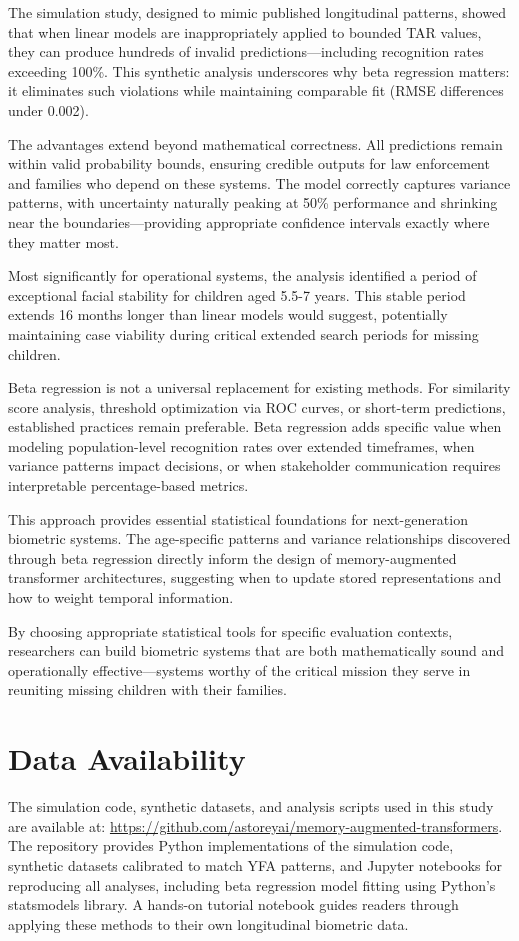 \documentclass[10pt,journal,compsoc]{IEEEtran}
\begin{document}
The simulation study, designed to mimic published longitudinal patterns, showed that when linear models are inappropriately applied to bounded TAR values, they can produce hundreds of invalid predictions---including recognition rates exceeding 100\%. This synthetic analysis underscores why beta regression matters: it eliminates such violations while maintaining comparable fit (RMSE differences under 0.002).

The advantages extend beyond mathematical correctness. All predictions remain within valid probability bounds, ensuring credible outputs for law enforcement and families who depend on these systems. The model correctly captures variance patterns, with uncertainty naturally peaking at 50\% performance and shrinking near the boundaries---providing appropriate confidence intervals exactly where they matter most.

Most significantly for operational systems, the analysis identified a period of exceptional facial stability for children aged 5.5-7 years. This stable period extends 16 months longer than linear models would suggest, potentially maintaining case viability during critical extended search periods for missing children.

Beta regression is not a universal replacement for existing methods. For similarity score analysis, threshold optimization via ROC curves, or short-term predictions, established practices remain preferable. Beta regression adds specific value when modeling population-level recognition rates over extended timeframes, when variance patterns impact decisions, or when stakeholder communication requires interpretable percentage-based metrics.

This approach provides essential statistical foundations for next-generation biometric systems. The age-specific patterns and variance relationships discovered through beta regression directly inform the design of memory-augmented transformer architectures, suggesting when to update stored representations and how to weight temporal information.

By choosing appropriate statistical tools for specific evaluation contexts, researchers can build biometric systems that are both mathematically sound and operationally effective---systems worthy of the critical mission they serve in reuniting missing children with their families.

\section*{Data Availability}
The simulation code, synthetic datasets, and analysis scripts used in this study are available at: \url{https://github.com/astoreyai/memory-augmented-transformers}. The repository provides Python implementations of the simulation code, synthetic datasets calibrated to match YFA patterns, and Jupyter notebooks for reproducing all analyses, including beta regression model fitting using Python's statsmodels library. A hands-on tutorial notebook guides readers through applying these methods to their own longitudinal biometric data.
\end{document}
